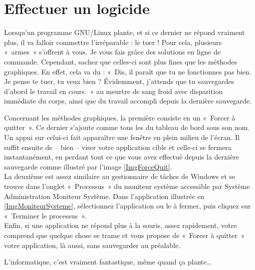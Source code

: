 \section{Effectuer un logicide}
\label{RefTuerProcessus}
Lorsqu'un programme GNU/Linux plante, et si ce dernier ne répond vraiment plus, il va falloir commettre l'irréparable : le tuer ! Pour cela, plusieurs «~armes~» s'offrent à vous. Je vous fais grâce des solutions en ligne de commande. Cependant, sachez que celles-ci sont plus fines que les méthodes graphiques. En effet, cela va du : «~Dis, il paraît que tu ne fonctionnes pas bien. Je pense te tuer, tu veux bien ? Évidemment, j'attends que tu sauvegardes d'abord le travail en cours.~» au meurtre de sang froid avec disparition immédiate du corps, ainsi que du travail accompli depuis la dernière sauvegarde.\par
\ForcerTuer
Concernant les méthodes graphiques, la première consiste en un  «~Forcer à quitter~». Ce dernier s'ajoute comme tous les  du tableau de bord sous son nom. Un appui sur celui-ci fait apparaître une fenêtre en plein milieu de l'écran. Il suffit ensuite de -- bien -- viser votre application cible et celle-ci se fermera instantanément, en perdant tout ce que vous avez effectué depuis la dernière sauvegarde comme illustré par l'image \ref{ImgForceQuit}.\\
La deuxième est assez similaire au gestionnaire de tâches de Windows et se trouve dans l'onglet «~Processus~» du moniteur système accessible par Système \FlecheDroite Administration \FlecheDroite Moniteur Système. Dans l'application illustrée en \ref{ImgMoniteurSysteme}, sélectionnez l'application ou le  à fermer, puis cliquez sur «~Terminer le processus~».\\
Enfin, si une application ne répond plus à la souris, assez rapidement, votre  comprend que quelque chose se trame et vous propose de «~Forcer à quitter~» votre application, là aussi, sans sauvegarder au préalable.\par
L'informatique, c'est vraiment fantastique, même quand ça plante\ldots{}
